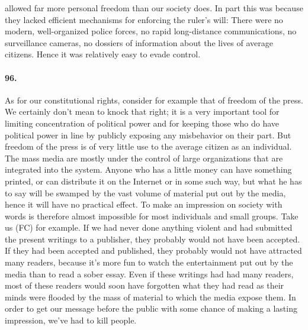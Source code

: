 \documentclass[12pt]{book}
\begin{document}
allowed far more personal freedom than our society does. In part this was because they lacked efficient mechanisms for enforcing the ruler's will: There were no modern, well-organized police forces, no rapid long-distance communications, no surveillance cameras, no dossiers of information about the lives of average citizens. Hence it was relatively easy to evade control.


\paragraph{96.} As for our constitutional rights, consider for example that of freedom of the press. We certainly don't mean to knock that right; it is a very important tool for limiting concentration of political power and for keeping those who do have political power in line by publicly exposing any misbehavior on their part. But freedom of the press is of very little use to the average citizen as an individual. The mass media are mostly under the control of large organizations that are integrated into the system. Anyone who has a little money can have something printed, or can distribute it on the Internet or in some such way, but what he has to say will be swamped by the vast volume of material put out by the media, hence it will have no practical effect. To make an impression on society with words is therefore almost impossible for most individuals and small groups. Take us (FC) for example. If we had never done anything violent and had submitted the present writings to a publisher, they probably would not have been accepted.  If they had been accepted and published, they probably would not have attracted many readers, because it's more fun to watch the entertainment put out by the media than to read a sober essay. Even if these writings had had many readers, most of these readers would soon have forgotten what they had read as their minds were flooded by the mass of material to which the media expose them. In order to get our message before the public with some chance of making a lasting impression, we've had to kill people.
\end{document}

